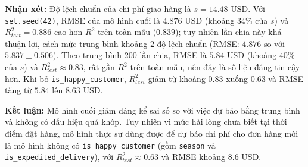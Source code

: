 \textbf{Nhận xét:} Độ lệch chuẩn của chi phí giao hàng là $s = 14.48$ USD. Với \texttt{set.seed(42)}, RMSE của mô hình cuối là $4.876$ USD (khoảng $34\%$ của $s$) và $R^2_{test} = 0.886$ cao hơn $R^2$ trên toàn mẫu ($0.839$); tuy nhiên lần chia này khá thuận lợi, cách mức trung bình khoảng $2$ độ lệch chuẩn (RMSE: $4.876$ so với $5.837 \pm 0.506$). Theo trung bình $200$ lần chia, RMSE là $5.84$ USD (khoảng $40\%$ của $s$) và $R^2_{test} \approx 0.83$, rất gần $R^2$ trên toàn mẫu, nên đây là số liệu đáng tin cậy hơn. Khi bỏ \texttt{is\_happy\_customer}, $R^2_{test}$ giảm từ khoảng $0.83$ xuống $0.63$ và RMSE tăng từ $5.84$ lên $8.63$ USD.

\textbf{Kết luận:} Mô hình cuối giảm đáng kể sai số so với việc dự báo bằng trung bình và không có dấu hiệu quá khớp. Tuy nhiên vì mức hài lòng chưa biết tại thời điểm đặt hàng, mô hình thực sự dùng được để dự báo chi phí cho đơn hàng mới là mô hình không có \texttt{is\_happy\_customer} (gồm \texttt{season} và \texttt{is\_expedited\_delivery}), với $R^2_{test} \approx 0.63$ và RMSE khoảng $8.6$ USD.

